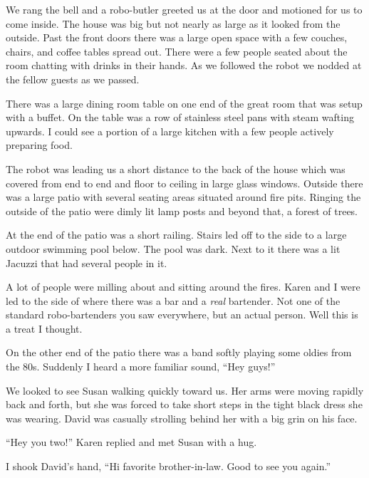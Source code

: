 We rang the bell and a robo-butler greeted us at the door and
motioned for us to come inside.  The house was big but not
nearly as large as it looked from the outside. Past the front
doors there was a large open space with a few couches, chairs,
and coffee tables spread out. There were a few people seated
about the room chatting with drinks in their hands. As we
followed the robot we nodded at the fellow guests as we passed.

There was a large dining room table on one end of the great room
that was setup with a buffet. On the table was a row of
stainless steel pans with steam wafting upwards. I could
see a portion of a large kitchen with a few people actively
preparing food.

The robot was leading us a short distance to the back of the
house which was covered from end to end and floor to
ceiling in large glass windows. Outside there was a large patio
with several seating areas situated around fire pits. Ringing
the outside of the patio were dimly lit lamp posts and beyond
that, a forest of trees.

At the end of the patio was a short railing. Stairs led off to
the side to a large outdoor swimming pool below. The pool was
dark. Next to it there was a lit Jacuzzi that had several people
in it.

A lot of people were milling about and
sitting around the fires.  Karen and I were led to the side of
where there was a bar and a \emph{real} bartender. Not
one of the standard robo-bartenders you saw everywhere, but an
actual person. Well this is a treat I thought.


On the other end of the patio there was a band softly playing
some oldies from the 80s.  Suddenly I heard a more familiar
sound, ``Hey guys!''

We looked to see Susan walking quickly toward us. Her arms were
moving rapidly back and forth, but she was forced to take short
steps in the tight black dress she was wearing. David was
casually strolling behind her with a big grin on his face.

``Hey you two!'' Karen replied and met Susan with a hug.

I shook David's hand, ``Hi favorite brother-in-law. Good to see
you again.''

